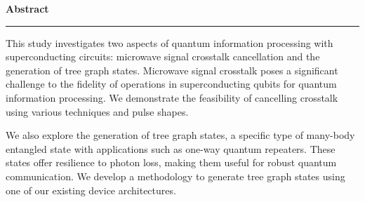 \thispagestyle{plain}
\vspace*{3cm}
\begin{center}
    \textbf{\LARGE Abstract}

    \rule{5cm}{0.4pt}

    \vspace{1cm}
\end{center}
This study investigates two aspects of quantum information processing with superconducting circuits: microwave signal crosstalk cancellation and the generation of tree graph states. 
Microwave signal crosstalk poses a significant challenge to the fidelity of operations in superconducting qubits for quantum information processing.
We demonstrate the feasibility of cancelling crosstalk using various techniques and pulse shapes.

We also explore the generation of tree graph states, a specific type of many-body entangled state with applications such as one-way quantum repeaters.
These states offer resilience to photon loss, making them useful for robust quantum communication.
We develop a methodology to generate tree graph states using one of our existing device architectures.

\restoregeometry
\newpage